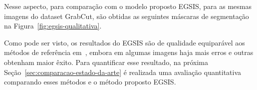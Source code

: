 
Nesse aspecto, para comparação com o modelo proposto \gls{EGSIS}, para
as mesmas imagens do dataset GrabCut, são obtidas as seguintes máscaras
de segmentação na Figura~\ref{fig:egsis-qualitativa}.

\begin{figure}[h!]
        \captionsetup{width=11.5cm}
		\centering
\end{figure}
\FloatBarrier{}



Como pode ser visto, os resultados do \gls{EGSIS} são de qualidade
equiparável aos métodos de referência em~, embora em
algumas imagens haja mais erros e outras obtenham maior êxito. Para
quantificar esse resultado, na próxima Seção~\ref{sec:comparacao-estado-da-arte} é realizada uma avaliação
quantitativa comparando esses métodos e o método proposto \gls{EGSIS}.


